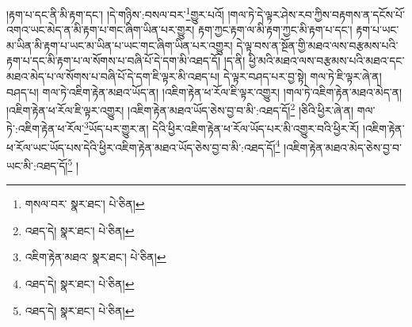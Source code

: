 །རྟག་པ་དང་ནི་མི་རྟག་དང་། །དེ་གཉིས་:བསལ་བར་\footnote{གསལ་བར་  སྣར་ཐང་།  པེ་ཅིན། }གྱུར་པའོ། །གལ་ཏེ་དེ་ལྟར་ཤེས་རབ་ཀྱིས་བརྟགས་ན་དངོས་པོ་འགའ་ཡང་མེད་ན་མི་རྟག་པ་གང་ཞིག་ཡིན་པར་གྱུར། རྟག་ཀྱང་རྟག་ལ་མི་རྟག་ཀྱང་མི་རྟག་པ་དང་། རྟག་པ་ཡང་མ་ཡིན་མི་རྟག་པ་ཡང་མ་ཡིན་པ་ཡང་གང་ཞིག་ཡིན་པར་འགྱུར། དེ་ལྟ་བས་ན་སྔོན་གྱི་མཐའ་ལས་བརྩམས་པའི་རྟག་པ་དང་མི་རྟག་པ་ལ་སོགས་པ་བཞི་པོ་དེ་དག་མི་འཐད་དོ། །ད་ནི། ཕྱི་མའི་མཐའ་ལས་བརྩམས་པའི་མཐའ་དང་མཐའ་མེད་པ་ལ་སོགས་པ་བཞི་པོ་དེ་དག་ཇི་ལྟར་མི་འཐད་པ། དེ་ལྟར་བཤད་པར་བྱ་སྟེ། གལ་ཏེ་ཇི་ལྟར་ཞེ་ན། བཤད་པ། གལ་ཏེ་འཇིག་རྟེན་མཐའ་ཡོད་ན། །འཇིག་རྟེན་ཕ་རོལ་ཇི་ལྟར་འགྱུར། །གལ་ཏེ་འཇིག་རྟེན་མཐའ་མེད་ན། །འཇིག་རྟེན་ཕ་རོལ་ཇི་ལྟར་འགྱུར། །འཇིག་རྟེན་མཐའ་ཡོད་ཅེས་བྱ་བ་མི་:འཐད་དོ།\footnote{འཐད་དེ།  སྣར་ཐང་།  པེ་ཅིན། } །ཅིའི་ཕྱིར་ཞེ་ན། གལ་ཏེ་:འཇིག་རྟེན་ཕ་རོལ་\footnote{འཇིག་རྟེན་མཐའ་  སྣར་ཐང་།  པེ་ཅིན། }ཡོད་པར་གྱུར་ན། དེའི་ཕྱིར་འཇིག་རྟེན་ཕ་རོལ་ཡོད་པར་མི་འགྱུར་བའི་ཕྱིར་རོ། །འཇིག་རྟེན་ཕ་རོལ་ཡང་ཡོད་པས་དེའི་ཕྱིར་འཇིག་རྟེན་མཐའ་ཡོད་ཅེས་བྱ་བ་མི་:འཐད་དོ།\footnote{འཐད་དེ།  སྣར་ཐང་།  པེ་ཅིན། } །འཇིག་རྟེན་མཐའ་མེད་ཅེས་བྱ་བ་ཡང་མི་:འཐད་དོ།\footnote{འཐད་དེ།  སྣར་ཐང་།  པེ་ཅིན། } །
